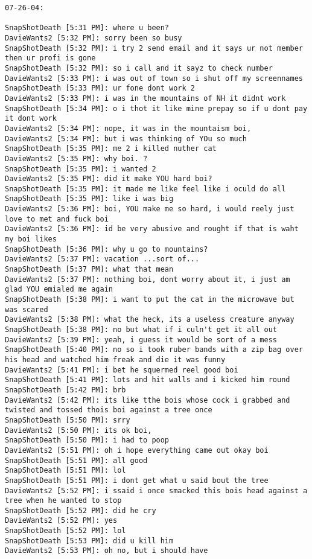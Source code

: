 \begin{verbatim}
07-26-04:

SnapShotDeath [5:31 PM]: where u been? 
DavieWants2 [5:32 PM]: sorry been so busy 
SnapShotDeath [5:32 PM]: i try 2 send email and it says ur not member then ur profi is gone 
SnapShotDeath [5:32 PM]: so i call and it sayz to check number 
DavieWants2 [5:33 PM]: i was out of town so i shut off my screennames 
SnapShotDeath [5:33 PM]: ur fone dont work 2 
DavieWants2 [5:33 PM]: i was in the mountains of NH it didnt work 
SnapShotDeath [5:34 PM]: o i thot it like mine prepay so if u dont pay it dont work 
DavieWants2 [5:34 PM]: nope, it was in the mountaism boi, 
DavieWants2 [5:34 PM]: but i was thinking of YOu so much 
SnapShotDeath [5:35 PM]: me 2 i killed nuther cat 
DavieWants2 [5:35 PM]: why boi. ? 
SnapShotDeath [5:35 PM]: i wanted 2 
DavieWants2 [5:35 PM]: did it make YOU hard boi? 
SnapShotDeath [5:35 PM]: it made me like feel like i oculd do all 
SnapShotDeath [5:35 PM]: like i was big 
DavieWants2 [5:36 PM]: boi, YOU make me so hard, i would reely just love to met and fuck boi 
DavieWants2 [5:36 PM]: id be very abusive and rought if that is waht my boi likes 
SnapShotDeath [5:36 PM]: why u go to mountains? 
DavieWants2 [5:37 PM]: vacation ...sort of... 
SnapShotDeath [5:37 PM]: what that mean 
DavieWants2 [5:37 PM]: nothing boi, dont worry about it, i just am glad YOU emialed me again 
SnapShotDeath [5:38 PM]: i want to put the cat in the microwave but was scared 
DavieWants2 [5:38 PM]: what the heck, its a useless creature anyway 
SnapShotDeath [5:38 PM]: no but what if i culn't get it all out 
DavieWants2 [5:39 PM]: yeah, i guess it would be sort of a mess 
SnapShotDeath [5:40 PM]: no so i took ruber bands with a zip bag over his head and watched him freak and die it was funny 
DavieWants2 [5:41 PM]: i bet he squermed reel good boi 
SnapShotDeath [5:41 PM]: lots and hit walls and i kicked him round 
SnapShotDeath [5:42 PM]: brb 
DavieWants2 [5:42 PM]: its like tthe bois whose cock i grabbed and twisted and tossed thois boi against a tree once 
SnapShotDeath [5:50 PM]: srry 
DavieWants2 [5:50 PM]: its ok boi, 
SnapShotDeath [5:50 PM]: i had to poop 
DavieWants2 [5:51 PM]: oh i hope everything came out okay boi 
SnapShotDeath [5:51 PM]: all good 
SnapShotDeath [5:51 PM]: lol 
SnapShotDeath [5:51 PM]: i dont get what u said bout the tree 
DavieWants2 [5:52 PM]: i ssaid i once smacked this bois head against a tree when he wanted to stop 
SnapShotDeath [5:52 PM]: did he cry 
DavieWants2 [5:52 PM]: yes 
SnapShotDeath [5:52 PM]: lol 
SnapShotDeath [5:53 PM]: did u kill him 
DavieWants2 [5:53 PM]: oh no, but i should have 

\end{verbatim}
